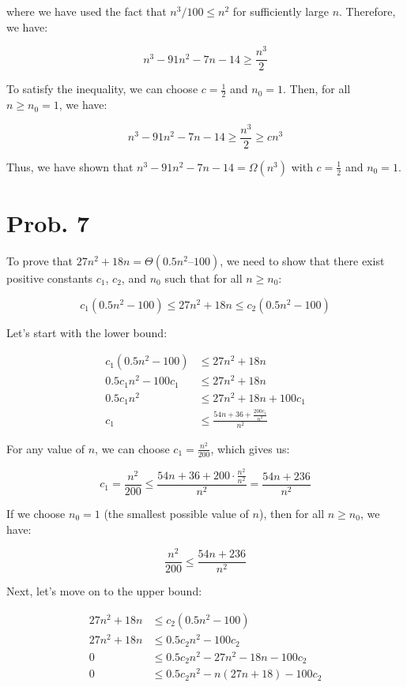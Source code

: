 \documentclass[12pt]{article}
\begin{document}
where we have used the fact that $n^3/100 \leq n^2$ for sufficiently large $n$. Therefore, we have:

$$n^3 - 91n^2 - 7n - 14 \geq \frac{n^3}{2}$$

To satisfy the inequality, we can choose $c=\frac{1}{2}$ and $n_0=1$. Then, for all $n \geq n_0=1$, we have:

$$n^3 - 91n^2 - 7n - 14 \geq \frac{n^3}{2} \geq cn^3$$

Thus, we have shown that $n^3 - 91n^2 - 7n - 14 = \Omega(n^3)$ with $c=\frac{1}{2}$ and $n_0=1$.

\section{Prob. 7}
To prove that $27n^2 + 18n = \Theta(0.5n^2 – 100)$, we need to show that there exist positive constants $c_1$, $c_2$, and $n_0$ such that for all $n \geq n_0$:

$$c_1(0.5n^2 - 100) \leq 27n^2 + 18n \leq c_2(0.5n^2 - 100)$$

Let's start with the lower bound:

\begin{align*}
c_1(0.5n^2 - 100) &\leq 27n^2 + 18n \\
0.5c_1n^2 - 100c_1 &\leq 27n^2 + 18n \\
0.5c_1n^2 &\leq 27n^2 + 18n + 100c_1 \\
c_1 &\leq \frac{54n + 36 + \frac{200c_1}{n^2}}{n^2}
\end{align*}

For any value of $n$, we can choose $c_1 = \frac{n^2}{200}$, which gives us:

$$c_1 = \frac{n^2}{200} \leq \frac{54n + 36 + 200\cdot\frac{n^2}{n^2}}{n^2} = \frac{54n + 236}{n^2}$$

If we choose $n_0 = 1$ (the smallest possible value of $n$), then for all $n \geq n_0$, we have:

$$\frac{n^2}{200} \leq \frac{54n + 236}{n^2}$$

Next, let's move on to the upper bound:

\begin{align*}
27n^2 + 18n &\leq c_2(0.5n^2 - 100) \\
27n^2 + 18n &\leq 0.5c_2n^2 - 100c_2 \\
0 &\leq 0.5c_2n^2 - 27n^2 - 18n - 100c_2 \\
0 &\leq 0.5c_2n^2 - n(27n + 18) - 100c_2 \\
\end{align*}
\end{document}
